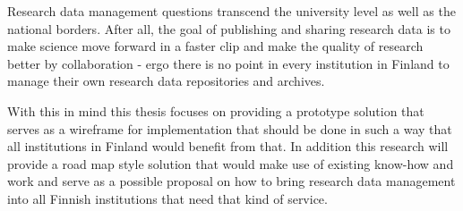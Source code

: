 Research data management questions transcend the university level as well
as the national borders. After all, the goal of publishing and sharing
research data is to make science move forward in a faster clip and make the
quality of research better by collaboration - ergo there is no point in every
institution in Finland to manage their own research data repositories and
archives.

With this in mind this thesis focuses on providing a prototype solution that
serves as a wireframe for implementation that should be done in such a way that
all institutions in Finland would benefit from that. In addition this research
will provide a road map style solution that would make use of existing know-how
and work and serve as a possible proposal on how to bring research data
management into all Finnish institutions that need that kind of service.
\fi
